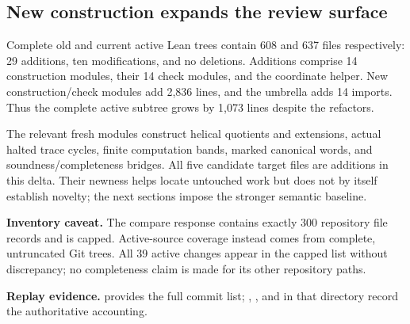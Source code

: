 \subsection{New construction expands the review surface}
Complete old and current active Lean trees contain 608 and 637 files respectively: 29 additions, ten modifications, and no deletions. Additions comprise 14 construction modules, their 14 check modules, and the coordinate helper. New construction/check modules add 2,836 lines, and the umbrella adds 14 imports. Thus the complete active subtree grows by 1,073 lines despite the refactors.

The relevant fresh modules construct helical quotients and extensions, actual halted trace cycles, finite computation bands, marked canonical words, and soundness/completeness bridges. All five candidate target files are additions in this delta. Their newness helps locate untouched work but does not by itself establish novelty; the next sections impose the stronger semantic baseline.

\textbf{Inventory caveat.} The compare response contains exactly 300 repository file records and is capped. Active-source coverage instead comes from complete, untruncated Git trees. All 39 active changes appear in the capped list without discrepancy; no completeness claim is made for its other repository paths.

\textbf{Replay evidence.}  provides the full commit list; , , and  in that directory record the authoritative accounting.
